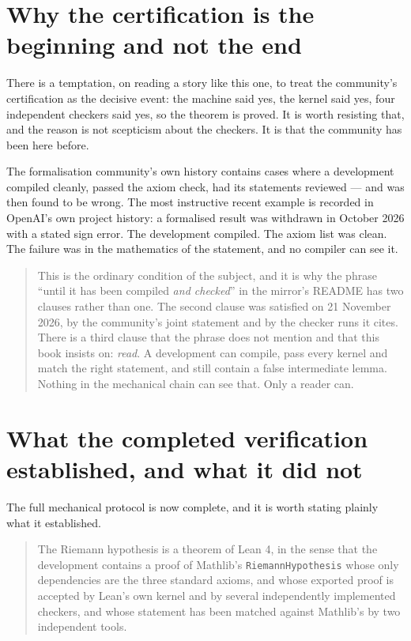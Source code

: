 \section{Why the certification is the beginning and not the end}There is a temptation, on reading a story like this one, to treat the
community's certification as the decisive event: the machine said yes, the
kernel said yes, four independent checkers said yes, so the theorem is proved.
It is worth resisting that, and the reason is not scepticism about the
checkers. It is that the community has been here before.

The formalisation community's own history contains cases where a development
compiled cleanly, passed the axiom check, had its statements reviewed --- and
was then found to be wrong. The most instructive recent example is recorded in
OpenAI's own project history: a formalised result was withdrawn in October 2026
with a stated sign error. The development compiled. The axiom list was clean.
The failure was in the mathematics of the statement, and no compiler can see
it.

\begin{quote}
This is the ordinary condition of the subject, and it is why the phrase
``until it has been compiled \emph{and checked}'' in the mirror's README has
two clauses rather than one. The second clause was satisfied on 21 November
2026, by the community's joint statement and by the checker runs it cites.
There is a third clause that the phrase does not mention and that this book
insists on: \emph{read}. A development can compile, pass every kernel and
match the right statement, and still contain a false intermediate lemma.
Nothing in the mechanical chain can see that. Only a reader can.
\end{quote}

\section{What the completed verification established, and what it did not}The full mechanical protocol is now complete, and it is worth stating
plainly what it established.

\begin{quote}
The Riemann hypothesis is a theorem of Lean 4, in the sense that the
development contains a proof of Mathlib's \texttt{RiemannHypothesis} whose
only dependencies are the three standard axioms, and whose exported proof is
accepted by Lean's own kernel and by several independently implemented
checkers, and whose statement has been matched against Mathlib's by two
independent tools.
\end{quote}

